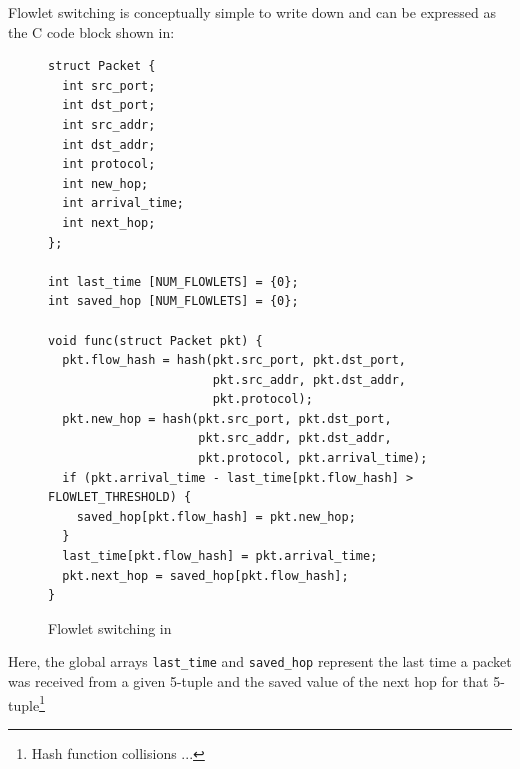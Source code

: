 Flowlet switching is conceptually simple to write down and can be expressed
as the C code block shown in:
\begin{figure}
\begin{small}
\begin{lstlisting}
struct Packet {
  int src_port;
  int dst_port;
  int src_addr;
  int dst_addr;
  int protocol;
  int new_hop;
  int arrival_time;
  int next_hop;
};

int last_time [NUM_FLOWLETS] = {0};
int saved_hop [NUM_FLOWLETS] = {0};

void func(struct Packet pkt) {
  pkt.flow_hash = hash(pkt.src_port, pkt.dst_port,
                       pkt.src_addr, pkt.dst_addr,
                       pkt.protocol);
  pkt.new_hop = hash(pkt.src_port, pkt.dst_port,
                     pkt.src_addr, pkt.dst_addr,
                     pkt.protocol, pkt.arrival_time);
  if (pkt.arrival_time - last_time[pkt.flow_hash] > FLOWLET_THRESHOLD) {
    saved_hop[pkt.flow_hash] = pkt.new_hop;
  }
  last_time[pkt.flow_hash] = pkt.arrival_time;
  pkt.next_hop = saved_hop[pkt.flow_hash];
}
\end{lstlisting}
\end{small}
\label{fig:flowlet}
\caption{Flowlet switching in \pktlanguage}
\end{figure}

Here, the global arrays \texttt{last\_time} and \texttt{saved\_hop} represent
the last time a packet was received from a given 5-tuple and the saved value of
the next hop for that 5-tuple\footnote{Hash function collisions ... }
